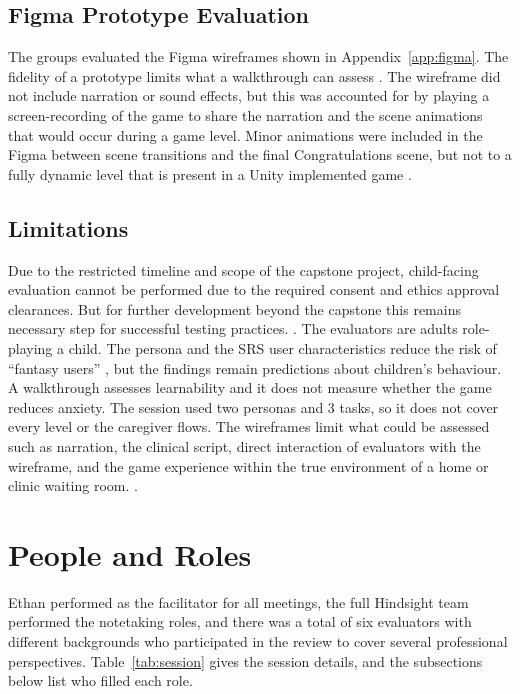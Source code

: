 \documentclass{article}
\begin{document}
\subsection{Figma Prototype Evaluation}

The groups evaluated the Figma wireframes shown in Appendix~\ref{app:figma}. The fidelity of a 
prototype limits what a walkthrough can assess \cite{nng-workshop}. The wireframe did not include 
narration or sound effects, but this was accounted for by playing a screen-recording of the game 
to share the narration and the scene animations that would occur during a game level. Minor 
animations were included in the Figma between scene transitions and the final Congratulations scene,
but not to a fully dynamic level that is present in a Unity implemented game \cite{srs}.

\subsection{Limitations}
Due to the restricted timeline and scope of the capstone project, child-facing evaluation cannot be 
performed due to the required consent and ethics approval clearances. But for further development 
beyond the capstone this remains necessary step for successful testing practices. \cite{srs}. The evaluators 
are adults role-playing a child. The persona and the SRS user characteristics reduce the risk of ``fantasy users'' 
\cite{nng-workshop}, but the findings remain predictions about children's behaviour. A walkthrough assesses 
learnability and it does not measure whether the game reduces anxiety. The session used two personas and 3 tasks,
so it does not cover every level or the caregiver flows. The wireframes limit what could be assessed such as narration, 
the clinical script, direct interaction of evaluators with the wireframe, and the game experience within the 
true environment of a home or clinic waiting room. \cite{srs}.

\section{People and Roles}

Ethan performed as the facilitator for all meetings, the full Hindsight team performed the notetaking roles, 
and there was a total of six evaluators with different backgrounds who participated in the review to cover 
several professional perspectives. Table~\ref{tab:session} gives the session details, and the subsections 
below list who filled each role.
\end{document}
